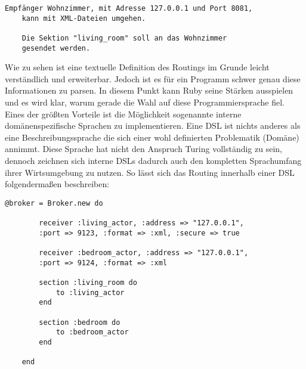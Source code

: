 \lstset{language=bash}
\begin{lstlisting}[caption=Beschreibung des Routings als Pseudocode, captionpos=b]
	Empfänger Wohnzimmer, mit Adresse 127.0.0.1 und Port 8081, 
	kann mit XML-Dateien umgehen.

	Die Sektion "living_room" soll an das Wohnzimmer 
	gesendet werden.

\end{lstlisting}

Wie zu sehen ist eine textuelle Definition des Routings im Grunde leicht verständlich und erweiterbar. Jedoch ist es für ein Programm schwer genau diese Informationen zu parsen. In diesem Punkt kann Ruby seine Stärken ausspielen und es wird klar, warum gerade die Wahl auf diese Programmiersprache fiel. Eines der größten Vorteile ist die Möglichkeit sogenannte interne domänenspezifische Sprachen zu implementieren. Eine DSL ist nichts anderes als eine Beschreibungssprache die sich einer wohl definierten Problematik (Domäne) annimmt. Diese Sprache hat nicht den Anspruch Turing vollständig zu sein, dennoch zeichnen sich interne DSLs dadurch auch den kompletten Sprachumfang ihrer Wirtsumgebung zu nutzen. So lässt sich das Routing innerhalb einer DSL folgendermaßen beschreiben: 

\lstset{language=Ruby}
\begin{lstlisting}[caption= Interne Routing-DSL des Brain, captionpos=b]
	@broker = Broker.new do 

		receiver :living_actor, :address => "127.0.0.1", 
		:port => 9123, :format => :xml, :secure => true
		
		receiver :bedroom_actor, :address => "127.0.0.1", 
		:port => 9124, :format => :xml
		
		section :living_room do
			to :living_actor
		end

		section :bedroom do
			to :bedroom_actor
		end

	end
\end{lstlisting}

